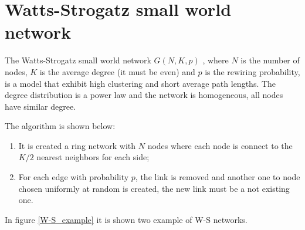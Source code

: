 \section{Watts-Strogatz small world network}

The Watts-Strogatz small world network $G(N, K, p)$ \cite{Watts-Strogatz_1998}, where $N$ is the number of nodes, $K$ is the average degree (it must be even) and $p$ is the rewiring probability, is a model that exhibit high clustering and short average path lengths. The degree distribution is a power law and the network is homogeneous, all nodes have similar degree.

The algorithm is shown below:
\begin{enumerate}
    \item It is created a ring network with $N$ nodes where each node is connect to the $K/2$ nearest neighbors for each side;
    \item For each edge with probability $p$, the link is removed and another one to node chosen uniformly at random is created, the new link must be a not existing one.
\end{enumerate}

In figure \ref{W-S_example} it is shown two example of W-S networks.

